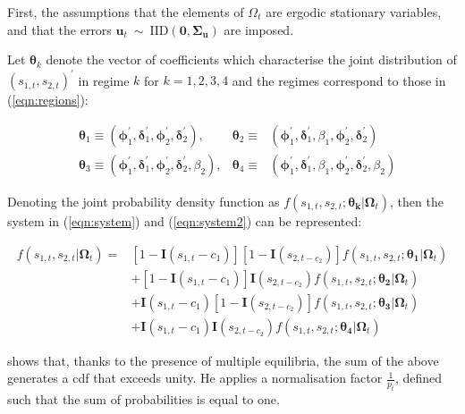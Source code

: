 \documentclass[../base.tex]{subfiles}
\begin{document}
First, the assumptions that the elements of $\Omega_t$ are ergodic stationary variables, and that the errors $\mathbf{u}_t~\sim~\text{IID}(\mathbf{0}, \mathbf{\Sigma_u})$ are imposed. 

Let $\boldsymbol{\theta}_k$ denote the vector of coefficients which characterise the joint distribution of $(s_{1,t}, s_{2,t})^{\prime}$ in regime $k$ for $k = 1, 2, 3, 4$ and the regimes correspond to those in (\ref{eqn:regions}):

\begin{align*}
	\label{eqn:fiml_coefs}
	&\boldsymbol{\theta}_1 \equiv (\boldsymbol{\phi}^{\prime}_1, \boldsymbol{\delta}^{\prime}_1,  \boldsymbol{\phi}^{\prime}_2, \boldsymbol{\delta}^{\prime}_2), 	&\boldsymbol{\theta}_2 \equiv ~~~ (\boldsymbol{\phi}^{\prime}_1, \boldsymbol{\delta}^{\prime}_1,
	\beta_1,  \boldsymbol{\phi}^{\prime}_2, \boldsymbol{\delta}^{\prime}_2) \\
	&\boldsymbol{\theta}_3 \equiv (\boldsymbol{\phi}^{\prime}_1, \boldsymbol{\delta}^{\prime}_1,  \boldsymbol{\phi}^{\prime}_2, \boldsymbol{\delta}^{\prime}_2, \beta_2), 	&\boldsymbol{\theta}_4 \equiv ~~~ (\boldsymbol{\phi}^{\prime}_1, \boldsymbol{\delta}^{\prime}_1,
	\beta_1,  \boldsymbol{\phi}^{\prime}_2, \boldsymbol{\delta}^{\prime}_2, \beta_2)
\end{align*}

Denoting the joint probability density function as $f(s_{1,t}, s_{2,t}; \boldsymbol{\theta_k} | \boldsymbol{\Omega}_t)$, then the system in (\ref{eqn:system}) and (\ref{eqn:system2}) can be represented:

\begin{align}	\label{eqn:fiml_decomp}
	f(s_{1,t}, s_{2,t} | \boldsymbol{\Omega}_t) =& [1 - \mathbf{I}(s_{1,t} - c_1)][1 - \mathbf{I}(s_{2,t - c_2})] f(s_{1,t}, s_{2,t}; \boldsymbol{\theta_1} | \boldsymbol{\Omega}_t)\\	
	&+ [1 - \mathbf{I}(s_{1,t} - c_1)]\mathbf{I}(s_{2,t - c_2})f(s_{1,t}, s_{2,t}; \boldsymbol{\theta_2} | \boldsymbol{\Omega}_t)\\
	&+ \mathbf{I}(s_{1,t} - c_1)[1 - \mathbf{I}(s_{2,t - c_2})]f(s_{1,t}, s_{2,t}; \boldsymbol{\theta_3} | \boldsymbol{\Omega}_t)\\
	&+ \mathbf{I}(s_{1,t} - c_1)\mathbf{I}(s_{2,t - c_2})f(s_{1,t}, s_{2,t}; \boldsymbol{\theta_4} | \boldsymbol{\Omega}_t) \label{eqn:fiml_decomp2}
\end{align}

\cite{massacci2007identification} shows that, thanks to the presence of multiple equilibria, the sum of the above generates a cdf that exceeds unity. He applies a normalisation factor $\frac{1}{p_t}$, defined such that the sum of probabilities is equal to one. 
\end{document}
